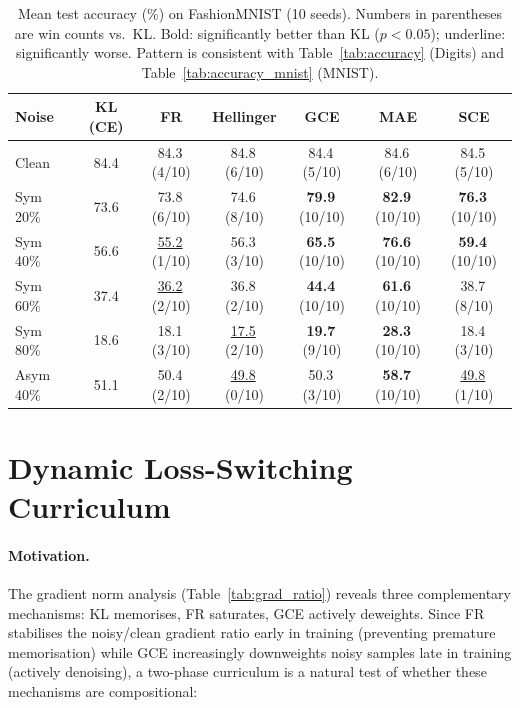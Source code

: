 \documentclass[11pt]{article}
\begin{document}
\begin{table}[h]
  \centering
  \caption{Mean test accuracy (\%) on FashionMNIST (10 seeds).
    Numbers in parentheses are win counts vs.\ KL.
    Bold: significantly better than KL ($p<0.05$); underline: significantly worse.
    Pattern is consistent with Table~\ref{tab:accuracy} (Digits) and Table~\ref{tab:accuracy_mnist} (MNIST).}
  \label{tab:accuracy_fashion}
  \small
  \begin{tabular}{lcccccc}
    \toprule
    Noise & KL (CE) & FR & Hellinger & GCE & MAE & SCE \\
    \midrule
    Clean    & 84.4 & 84.3\,(4/10) & 84.8\,(6/10) & 84.4\,(5/10) & 84.6\,(6/10) & 84.5\,(5/10) \\
    Sym 20\% & 73.6 & 73.8\,(6/10) & 74.6\,(8/10) & \textbf{79.9}\,(10/10) & \textbf{82.9}\,(10/10) & \textbf{76.3}\,(10/10) \\
    Sym 40\% & 56.6 & \underline{55.2}\,(1/10) & 56.3\,(3/10) & \textbf{65.5}\,(10/10) & \textbf{76.6}\,(10/10) & \textbf{59.4}\,(10/10) \\
    Sym 60\% & 37.4 & \underline{36.2}\,(2/10) & 36.8\,(2/10) & \textbf{44.4}\,(10/10) & \textbf{61.6}\,(10/10) & 38.7\,(8/10) \\
    Sym 80\% & 18.6 & 18.1\,(3/10) & \underline{17.5}\,(2/10) & \textbf{19.7}\,(9/10) & \textbf{28.3}\,(10/10) & 18.4\,(3/10) \\
    Asym 40\% & 51.1 & 50.4\,(2/10) & \underline{49.8}\,(0/10) & 50.3\,(3/10) & \textbf{58.7}\,(10/10) & \underline{49.8}\,(1/10) \\
    \bottomrule
  \end{tabular}
\end{table}

\section{Dynamic Loss-Switching Curriculum}
\label{sec:dynamic_loss}

\paragraph{Motivation.}
The gradient norm analysis (Table~\ref{tab:grad_ratio}) reveals three complementary
mechanisms: KL memorises, FR saturates, GCE actively deweights.
Since FR stabilises the noisy/clean gradient ratio early in training
(preventing premature memorisation) while GCE increasingly downweights noisy
samples late in training (actively denoising), a two-phase curriculum is a
natural test of whether these mechanisms are compositional:
\end{document}
